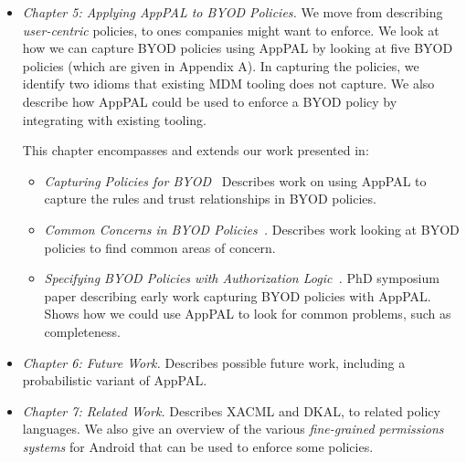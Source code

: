 \documentclass[thesis.tex]{subfiles}
\begin{document}
\begin{itemize}
\item \emph{Chapter 5: Applying AppPAL to BYOD Policies.}
  We move from describing \emph{user-centric} policies, to ones companies might
  want to enforce. We look at how we can capture BYOD policies using AppPAL by
  looking at five BYOD policies (which are given in Appendix A). In capturing the
  policies, we identify two idioms that existing MDM tooling does not capture. We
  also describe how AppPAL could be used to enforce a BYOD policy by integrating
  with existing tooling.
  
  This chapter encompasses and extends our work presented in:
  \begin{itemize}
  \item\emph{Capturing Policies for BYOD~\cite{hallett_capturing_2017}} Describes work on using AppPAL to capture the rules and trust relationships in BYOD policies.
  \item\emph{Common Concerns in BYOD Policies~\cite{hallett_common_2017}.} Describes work looking at BYOD policies to find common areas of concern.  
  \item\emph{Specifying BYOD Policies with Authorization Logic~\cite{hallett_specifying_2016}.} PhD symposium paper describing early work capturing BYOD policies with AppPAL.  Shows how we could use AppPAL to look for common problems, such as completeness.
  \end{itemize}

\item \emph{Chapter 6: Future Work.}
  Describes possible future work, including a probabilistic variant of AppPAL.
 
\item \emph{Chapter 7: Related Work.} 
  Describes XACML and DKAL, to related policy languages. We also give an overview
  of the various \emph{fine-grained permissions systems} for Android that can be
  used to enforce some policies.
\end{itemize}
\end{document}
